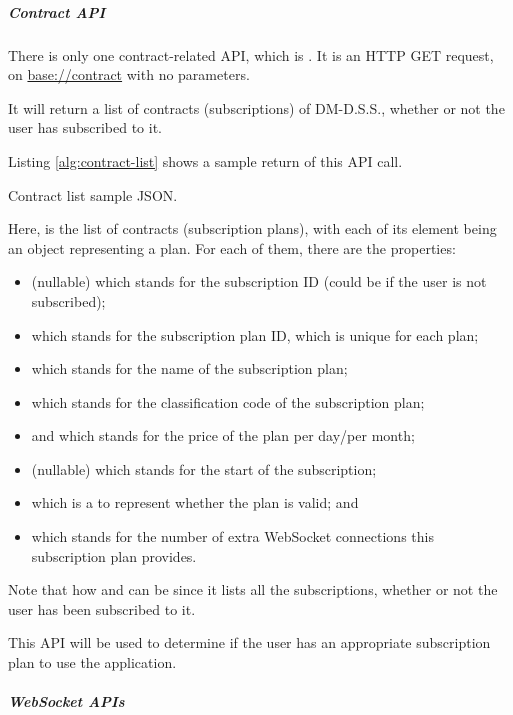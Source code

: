 \subparagraph{Contract API}

There is only one contract-related API, which is . It is an HTTP GET request, on \url{base://contract} with no parameters.

It will return a list of contracts (subscriptions) of DM-D.S.S., whether or not the user has subscribed to it.

Listing \ref{alg:contract-list} shows a sample return of this API call.
\begin{listing}[!ht]
    \caption{Contract list sample JSON.}
    \label{alg:contract-list}
\end{listing}

Here,  is the list of contracts (subscription plans), with each of its element being an object representing a plan. For each of them, there are the properties:
\begin{itemize}
    \item {} (nullable) which stands for the subscription ID (could be  if the user is not subscribed);
    \item {} which stands for the subscription plan ID, which is unique for each plan;
    \item {} which stands for the name of the subscription plan;
    \item {} which stands for the classification code of the subscription plan;
    \item {} and  which stands for the price of the plan per day/per month;
    \item {} (nullable) which stands for the start of the subscription;
    \item {} which is a  to represent whether the plan is valid; and
    \item {} which stands for the number of extra WebSocket connections this subscription plan provides.
\end{itemize}

Note that how  and  can be  since it lists all the subscriptions, whether or not the user has been subscribed to it.

This API will be used to determine if the user has an appropriate subscription plan to use the application.

\subparagraph{WebSocket APIs}

